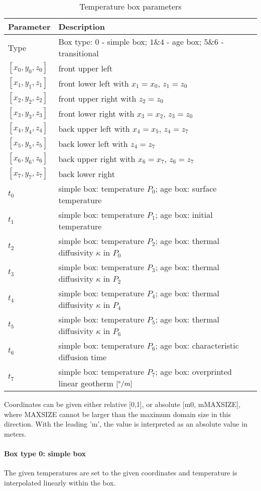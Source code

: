 \begin{table}[H]
\centering
\begin{tabular}{l l}
\toprule
Parameter		& Description\\
\midrule
Type			& Box type: $0$ - simple box; $1\&4$ - age box; $5\&6$ - transitional\\
$[x_0,y_0,z_0]$ & front upper left\\
$[x_1,y_1,z_1]$ & front lower left with $x_1=x_0$, $z_1=z_0$\\
$[x_2,y_2,z_2]$ & front upper right with $z_2=z_0$\\ 
$[x_3,y_3,z_3]$ & front lower right with $x_3=x_2$, $z_3=z_0$\\ 
$[x_4,y_4,z_4]$ & back upper left with $x_4=x_5$, $z_4=z_7$\\  
$[x_5,y_5,z_5]$ & back lower left with $z_4=z_7$\\ 
$[x_6,y_6,z_6]$ & back upper right with $x_6=x_7$, $z_6=z_7$\\
$[x_7,y_7,z_7]$ & back lower right\\
$t_0$ & simple box: temperature $P_0$; age box: surface temperature\\
$t_1$ & simple box: temperature $P_1$; age box: initial temperature\\
$t_2$ & simple box: temperature $P_2$; age box: thermal diffusivity $\kappa$ in $P_0$\\
$t_3$ & simple box: temperature $P_3$; age box: thermal diffusivity $\kappa$ in $P_2$\\
$t_4$ & simple box: temperature $P_4$; age box: thermal diffusivity $\kappa$ in $P_4$\\
$t_5$ & simple box: temperature $P_5$; age box: thermal diffusivity $\kappa$ in $P_6$\\
$t_6$ & simple box: temperature $P_6$; age box: characteristic diffusion time\\
$t_7$ & simple box: temperature $P_7$; age box: overprinted linear geotherm $[\degree/m]$\\
\bottomrule
\end{tabular}
\caption{Temperature box parameters}
\label{tbl:t_box_parameters}
\end{table}

Coordinates can be given either relative [0,1], or absolute [m0, mMAXSIZE], where MAXSIZE cannot be larger than the maximum domain size in this direction. With the leading 'm', the value is interpreted as an absolute value in meters.

\paragraph{Box type 0: simple box}
The given temperatures are set to the given coordinates and temperature is interpolated linearly within the box.

